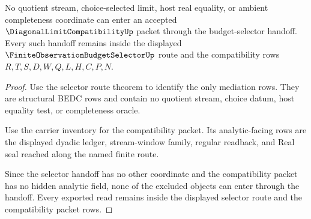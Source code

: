 \begin{theorem}\label{thm:diagonal-limit-compatibility-budget-selector-nonescape}
No quotient stream, choice-selected limit, host real equality, or ambient completeness coordinate can enter an accepted $\DiagonalLimitCompatibilityUp$ packet through the budget-selector handoff. Every such handoff remains inside the displayed $\FiniteObservationBudgetSelectorUp$ route and the compatibility rows $R,T,S,D,W,Q,L,H,C,P,N$.
\end{theorem}
\begin{proof}
Use the selector route theorem to identify the only mediation rows. They are structural BEDC rows and contain no quotient stream, choice datum, host equality test, or completeness oracle.

Use the carrier inventory for the compatibility packet. Its analytic-facing rows are the displayed dyadic ledger, stream-window family, regular readback, and Real seal reached along the named finite route.

Since the selector handoff has no other coordinate and the compatibility packet has no hidden analytic field, none of the excluded objects can enter through the handoff. Every exported read remains inside the displayed selector route and the compatibility packet rows.
\end{proof}
